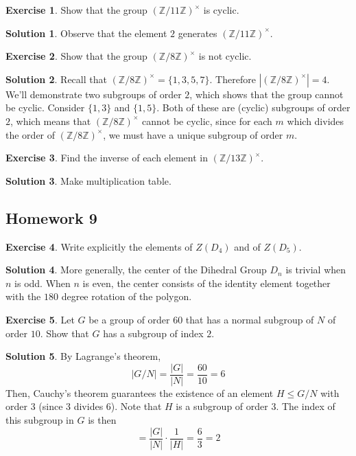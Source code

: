 \documentclass[12pt]{article}
\theoremstyle{definition}
\newcommand{\Z}{\mathbb{Z}}
\newtheorem{exercise}{\color{YellowOrange}Exercise}
\theoremstyle{definition}
\newtheorem{solution}{\color{Goldenrod}Solution}
\begin{document}
 \begin{exercise}
 	Show that the group $(\Z / 11 \Z)^{\times}$ is cyclic.
 \end{exercise}
 \begin{solution}
 	Observe that the element $2$ generates $(\Z / 11 \Z)^{\times}$.
 \end{solution}

 \begin{exercise}
	 Show that the group $(\Z / 8 \Z)^{\times}$ is not cyclic.
 \end{exercise}
 \begin{solution}
 	Recall that $(\Z / 8 \Z)^{\times} = \{1,3,5,7\}$. Therefore $|(\Z / 8 \Z)^{\times}| = 4$. We'll demonstrate two subgroups of order $2$, which shows that the group cannot be cyclic. Consider $\{1,3\}$ and $\{1,5\}$. Both of these are (cyclic) subgroups of order $2$, which means that $(\Z / 8 \Z)^{\times}$ cannot be cyclic, since for each $m$ which divides the order of $(\Z / 8 \Z)^{\times}$, we must have a unique subgroup of order $m$. 
 \end{solution}

 \begin{exercise}
 	Find the inverse of each element in $(\Z / 13 \Z)^{\times}$. 
 \end{exercise}
 \begin{solution}
 	Make multiplication table. 
 \end{solution}

\subsection{Homework 9}
\begin{exercise}
Write explicitly the elements of $Z(D_4)$ and of $Z(D_5)$.
\end{exercise}
\begin{solution}
More generally, the center of the Dihedral Group $D_n$ is trivial when $n$ is odd. When $n$ is even, the center consists of the identity element together with the $180$ degree rotation of the polygon.
\end{solution}

\begin{exercise}
	Let $G$ be a group of order 60 that has a normal subgroup of $N$ of order $10$. Show that $G$ has a subgroup of index $2$.
\end{exercise}
\begin{solution} \color{Red}{(Sketchy)}
	\color{Black}
	By Lagrange's theorem,
	\begin{equation}
		\vert G/ N \vert = \frac{|G|}{|N|} = \frac{60}{10} = 6
	\end{equation}
	Then, Cauchy's theorem guarantees the existence of an element $H \leq G/N$ with order $3$ (since 3 divides 6).  Note that $H$ is a subgroup of order $3$. The index of this subgroup in $G$ is then
	\begin{equation}
		[G/N:H] = \frac{|G|}{|N|} \cdot \frac{1}{|H|} = \frac{6}{3} = 2
	\end{equation}
\end{solution}
\end{document}
